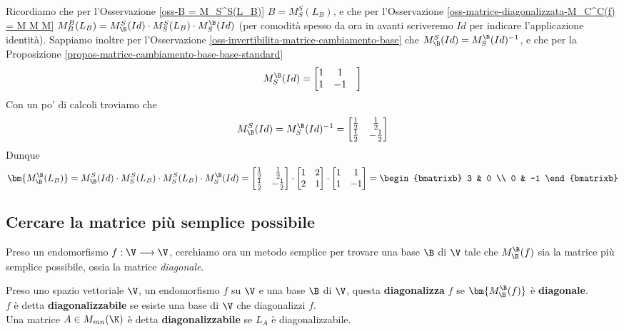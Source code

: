 \documentclass[11pt, a4paper, titlepage, oneside]{scrbook}
\begin{document}
Ricordiamo che per l'Osservazione \ref{oss-B = M_S^S(L_B)} $B = M_S^S(L_B)$, e che per l'Osservazione \ref{oss-matrice-diagonalizzata-M_C^C(f) = M M M} \mbox{$M_B^B(L_B) = M_\B^S(Id) \cdot M_S^S(L_B) \cdot M_S^\B(Id)$} (per comodità spesso da ora in avanti scriveremo $Id$ per indicare l'applicazione identità). Sappiamo inoltre per l'Osservazione \ref{oss-invertibilita-matrice-cambiamento-base} che $M_\B^S(Id) = M_S^\B(Id)^{-1}$, e che per la Proposizione \ref{propos-matrice-cambiamento-base-base-standard} 
\[M_S^\B(Id) = \begin{bmatrix}
    1 & 1 & \\
    1 & -1
\end{bmatrix}\]
Con un po' di calcoli troviamo che 
\[M_\B^S(Id) = M_S^\B(Id)^{-1} = \begin{bmatrix}
    \frac{1}{2} & \frac{1}{2} \\
    \frac{1}{2} & -\frac{1}{2}
\end{bmatrix}\]
Dunque
\[
\bm{M_\B^\B(L_B)} = M_\B^S(Id) \cdot M_S^S(L_B) \cdot M_S^S(L_B) \cdot M_S^\B(Id) = \begin{bmatrix}
\frac{1}{2} & \frac{1}{2} \\
\frac{1}{2} & -\frac{1}{2}    
\end{bmatrix} 
\cdot \begin{bmatrix}
    1  & 2 \\
    2 & 1
\end{bmatrix}
\cdot \begin{bmatrix}
    1 & 1 \\ 
    1 & -1
\end{bmatrix}
= \begin{bmatrixb}
    3 & 0 \\
    0 & -1
\end{bmatrixb}
\]

\subsection{Cercare la matrice più semplice possibile}
Preso un endomorfismo $f: \V \longrightarrow \V$, cerchiamo ora un metodo semplice per trovare una base $\B$ di $\V$ tale che $M_\B^\B(f)$ sia la matrice più semplice possibile, ossia la matrice \textit{diagonale}. 

\begin{Definizione}
\label{def-endomorfismo-diagonalizzabile}
Preso uno spazio vettoriale $\V$, un endomorfismo $f$ su $\V$ e una base $\B$ di $\V$, questa \textbf{diagonalizza} $f$ se $\bm{M_\B^\B(f)}$ è \textbf{diagonale}.\\
$f$ è detta \textbf{diagonalizzabile} se esiste una base di $\V$ che diagonalizzi $f$. \\
Una matrice $A \in M_{mn}(\K)$ è detta \textbf{diagonalizzabile} se $L_A$ è diagonalizzabile.
\end{Definizione}
\end{document}
